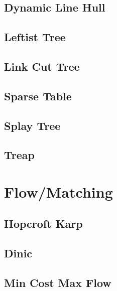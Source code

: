 \subsection{Dynamic Line Hull}

\subsection{Leftist Tree}

\subsection{Link Cut Tree}

%
%
\subsection{Sparse Table}

\subsection{Splay Tree}

\subsection{Treap}


\section{Flow/Matching}
\subsection{Hopcroft Karp}

\subsection{Dinic}

\subsection{Min Cost Max Flow}

